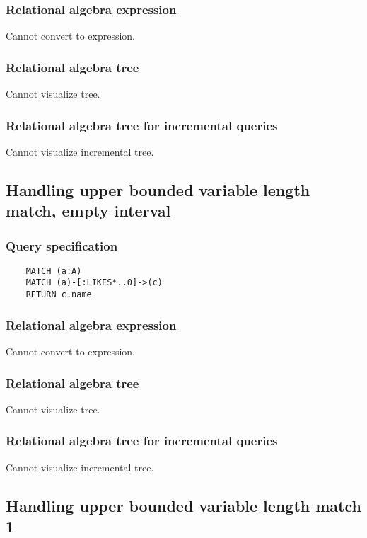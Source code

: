 	\subsubsection*{Relational algebra expression}

	Cannot convert to expression.

	\subsubsection*{Relational algebra tree}

	Cannot visualize tree.

	\subsubsection*{Relational algebra tree for incremental queries}

	Cannot visualize incremental tree.
	\subsection{Handling upper bounded variable length match, empty interval}

	\subsubsection*{Query specification}

	\begin{lstlisting}
	MATCH (a:A)
	MATCH (a)-[:LIKES*..0]->(c)
	RETURN c.name
	\end{lstlisting}


	\subsubsection*{Relational algebra expression}

	Cannot convert to expression.

	\subsubsection*{Relational algebra tree}

	Cannot visualize tree.

	\subsubsection*{Relational algebra tree for incremental queries}

	Cannot visualize incremental tree.
	\subsection{Handling upper bounded variable length match 1}


